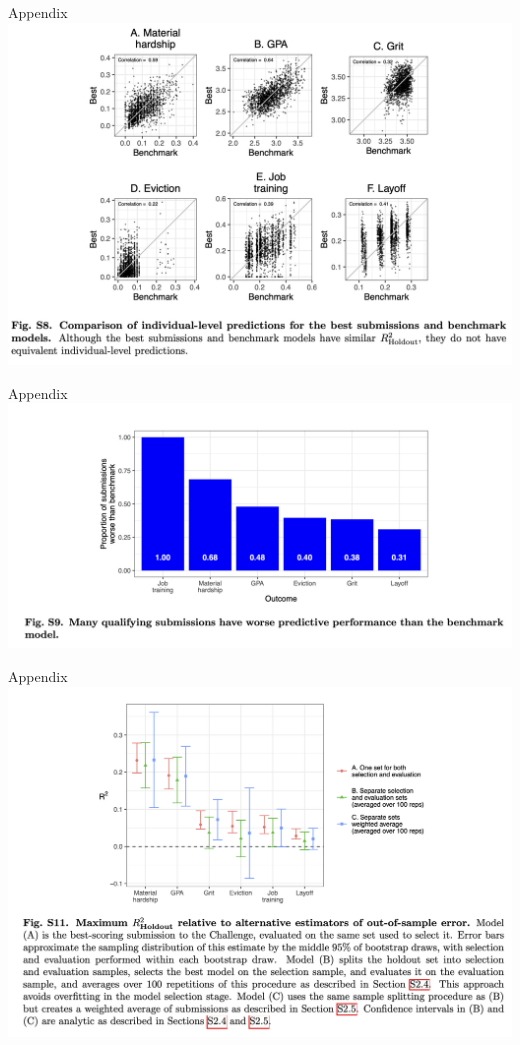 \documentclass{beamer}
\begin{document}
\begin{frame}{Appendix}
\includegraphics[width = \textwidth]{figures/si_best_benchmark_scatter}
\end{frame}

\begin{frame}{Appendix}
\includegraphics[width = \textwidth]{figures/si_worse_than_benchmark}
\end{frame}

\begin{frame}{Appendix}
\includegraphics[width = \textwidth]{figures/si_ensemble}
\end{frame}
\end{document}
